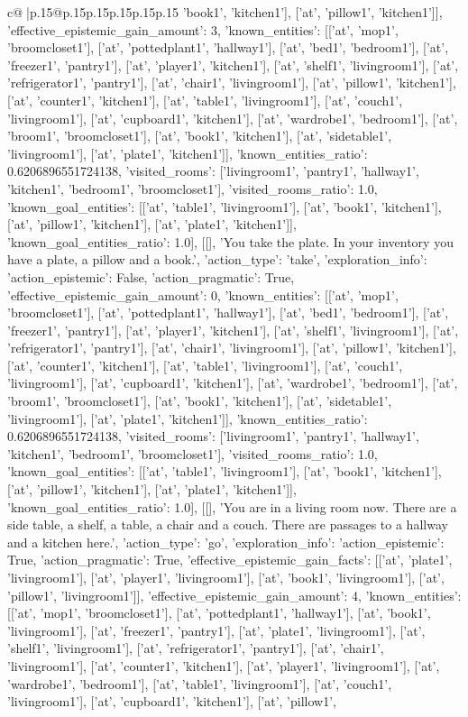 \documentclass{article}
\begin{document}
{\begin{supertabular}{c@{$\;$}|p{.15\linewidth}@{}p{.15\linewidth}p{.15\linewidth}p{.15\linewidth}p{.15\linewidth}p{.15\linewidth}}
{{{'book1', 'kitchen1'], ['at', 'pillow1', 'kitchen1']], 'effective_epistemic_gain_amount': 3, 'known_entities': [['at', 'mop1', 'broomcloset1'], ['at', 'pottedplant1', 'hallway1'], ['at', 'bed1', 'bedroom1'], ['at', 'freezer1', 'pantry1'], ['at', 'player1', 'kitchen1'], ['at', 'shelf1', 'livingroom1'], ['at', 'refrigerator1', 'pantry1'], ['at', 'chair1', 'livingroom1'], ['at', 'pillow1', 'kitchen1'], ['at', 'counter1', 'kitchen1'], ['at', 'table1', 'livingroom1'], ['at', 'couch1', 'livingroom1'], ['at', 'cupboard1', 'kitchen1'], ['at', 'wardrobe1', 'bedroom1'], ['at', 'broom1', 'broomcloset1'], ['at', 'book1', 'kitchen1'], ['at', 'sidetable1', 'livingroom1'], ['at', 'plate1', 'kitchen1']], 'known_entities_ratio': 0.6206896551724138, 'visited_rooms': ['livingroom1', 'pantry1', 'hallway1', 'kitchen1', 'bedroom1', 'broomcloset1'], 'visited_rooms_ratio': 1.0, 'known_goal_entities': [['at', 'table1', 'livingroom1'], ['at', 'book1', 'kitchen1'], ['at', 'pillow1', 'kitchen1'], ['at', 'plate1', 'kitchen1']], 'known_goal_entities_ratio': 1.0}}], [[], 'You take the plate. In your inventory you have a plate, a pillow and a book.', {'action_type': 'take', 'exploration_info': {'action_epistemic': False, 'action_pragmatic': True, 'effective_epistemic_gain_amount': 0, 'known_entities': [['at', 'mop1', 'broomcloset1'], ['at', 'pottedplant1', 'hallway1'], ['at', 'bed1', 'bedroom1'], ['at', 'freezer1', 'pantry1'], ['at', 'player1', 'kitchen1'], ['at', 'shelf1', 'livingroom1'], ['at', 'refrigerator1', 'pantry1'], ['at', 'chair1', 'livingroom1'], ['at', 'pillow1', 'kitchen1'], ['at', 'counter1', 'kitchen1'], ['at', 'table1', 'livingroom1'], ['at', 'couch1', 'livingroom1'], ['at', 'cupboard1', 'kitchen1'], ['at', 'wardrobe1', 'bedroom1'], ['at', 'broom1', 'broomcloset1'], ['at', 'book1', 'kitchen1'], ['at', 'sidetable1', 'livingroom1'], ['at', 'plate1', 'kitchen1']], 'known_entities_ratio': 0.6206896551724138, 'visited_rooms': ['livingroom1', 'pantry1', 'hallway1', 'kitchen1', 'bedroom1', 'broomcloset1'], 'visited_rooms_ratio': 1.0, 'known_goal_entities': [['at', 'table1', 'livingroom1'], ['at', 'book1', 'kitchen1'], ['at', 'pillow1', 'kitchen1'], ['at', 'plate1', 'kitchen1']], 'known_goal_entities_ratio': 1.0}}], [[], 'You are in a living room now. There are a side table, a shelf, a table, a chair and a couch. There are passages to a hallway and a kitchen here.', {'action_type': 'go', 'exploration_info': {'action_epistemic': True, 'action_pragmatic': True, 'effective_epistemic_gain_facts': [['at', 'plate1', 'livingroom1'], ['at', 'player1', 'livingroom1'], ['at', 'book1', 'livingroom1'], ['at', 'pillow1', 'livingroom1']], 'effective_epistemic_gain_amount': 4, 'known_entities': [['at', 'mop1', 'broomcloset1'], ['at', 'pottedplant1', 'hallway1'], ['at', 'book1', 'livingroom1'], ['at', 'freezer1', 'pantry1'], ['at', 'plate1', 'livingroom1'], ['at', 'shelf1', 'livingroom1'], ['at', 'refrigerator1', 'pantry1'], ['at', 'chair1', 'livingroom1'], ['at', 'counter1', 'kitchen1'], ['at', 'player1', 'livingroom1'], ['at', 'wardrobe1', 'bedroom1'], ['at', 'table1', 'livingroom1'], ['at', 'couch1', 'livingroom1'], ['at', 'cupboard1', 'kitchen1'], ['at', 'pillow1', }}}
\end{supertabular}}
\end{document}
